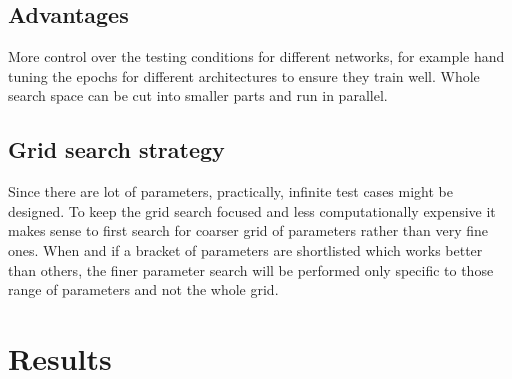 \subsection{Advantages} 
More control over the testing conditions for different networks, for example hand tuning the epochs for different architectures to ensure they train well.
Whole search space can be cut into smaller parts and run in parallel.

\subsection{Grid search strategy}
Since there are lot of parameters, practically, infinite test cases might be designed. To keep the grid search focused and less computationally expensive it makes sense to 
first search for coarser grid of parameters rather than very fine ones. When and if a bracket of parameters are shortlisted which works better than others, the finer parameter
search will be performed only specific to those range of parameters and not the whole grid.

\section{Results} 

